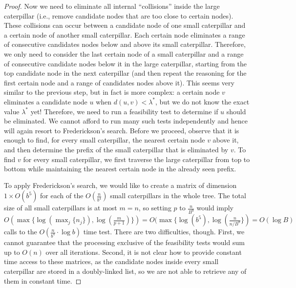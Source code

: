 \documentclass[a4paper,UKenglish]{lipics-v2016}
\theoremstyle{plain}
\begin{document}
\begin{proof}
Now we need to eliminate all internal ``collisions'' inside the large caterpillar (i.e., remove candidate nodes that
are too close to certain nodes). These collisions can occur between a candidate node of one small caterpillar
and a certain node of another small caterpillar. Each certain node eliminates a range of consecutive
candidates nodes below and above its small caterpillar. Therefore, we only need to consider the 
last certain node of a small caterpillar and a range of consecutive candidate nodes below it in the
large caterpillar, starting from the top candidate node in the next caterpillar (and then repeat
the reasoning for the first certain node and a range of candidates nodes above it). This seems very similar
to the previous step, but in fact is more complex: a certain node $v$ eliminates a candidate node $u$ when
$d(u,v)<\lambda^{*}$, but we do not know the exact value $\lambda^{*}$ yet! Therefore, we need to run
a feasibility test to determine if $u$ should be eliminated. We cannot afford to run many such tests
independently and hence will again resort to Frederickson's search. Before we proceed, observe that
it is enough to find, for every small caterpillar, the nearest certain node $v$ above it, and then determine
the prefix of the small caterpillar that is eliminated by $v$. To find $v$ for every small caterpillar,
we first traverse the large caterpillar from top to bottom while maintaining the nearest certain node
in the already seen prefix.

To apply Frederickson's search, we would like to create a matrix of dimension $1\times O(b^{5})$
for each of the $O(\frac{n}{b^{4}})$ small caterpillars in the whole tree. The total size of all small
caterpillars is at most $m=n$, so setting $p$ to $\frac{n}{B^9}$ would imply
$O(\max \lbrace \log(\max_{j} \lbrace n_j \rbrace), \log(\frac{m}{p+1}) \rbrace) = O(\max \lbrace \log (b^{5}), \log(\frac{n}{n/B^{9}} \rbrace) = O(\log B)$ calls to the $O(\frac{n}{b^{4}} \cdot \log b)$ time test.
There are two difficulties, though. First, we cannot guarantee that the processing exclusive of the feasibility tests
would sum up to $O(n)$ over all iterations. Second, it is not clear how to provide constant time access
to these matrices, as the candidate nodes inside every small caterpillar are stored in a doubly-linked list,
so we are not able to retrieve any of them in constant time. 


\end{proof}
\end{document}

